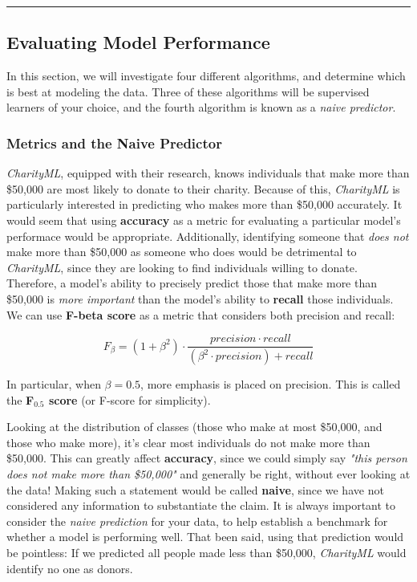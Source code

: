 \documentclass[11pt]{article}
\begin{document}
    \begin{center}\rule{0.5\linewidth}{\linethickness}\end{center}

\subsection{Evaluating Model
Performance}\label{evaluating-model-performance}

In this section, we will investigate four different algorithms, and
determine which is best at modeling the data. Three of these algorithms
will be supervised learners of your choice, and the fourth algorithm is
known as a \emph{naive predictor}.

    \subsubsection{Metrics and the Naive
Predictor}\label{metrics-and-the-naive-predictor}

\emph{CharityML}, equipped with their research, knows individuals that
make more than \$50,000 are most likely to donate to their charity.
Because of this, \emph{CharityML} is particularly interested in
predicting who makes more than \$50,000 accurately. It would seem that
using \textbf{accuracy} as a metric for evaluating a particular model's
performace would be appropriate. Additionally, identifying someone that
\emph{does not} make more than \$50,000 as someone who does would be
detrimental to \emph{CharityML}, since they are looking to find
individuals willing to donate. Therefore, a model's ability to precisely
predict those that make more than \$50,000 is \emph{more important} than
the model's ability to \textbf{recall} those individuals. We can use
\textbf{F-beta score} as a metric that considers both precision and
recall:

\[ F_{\beta} = (1 + \beta^2) \cdot \frac{precision \cdot recall}{\left( \beta^2 \cdot precision \right) + recall} \]

In particular, when \(\beta = 0.5\), more emphasis is placed on
precision. This is called the \textbf{F\(_{0.5}\) score} (or F-score for
simplicity).

Looking at the distribution of classes (those who make at most \$50,000,
and those who make more), it's clear most individuals do not make more
than \$50,000. This can greatly affect \textbf{accuracy}, since we could
simply say \emph{"this person does not make more than \$50,000"} and
generally be right, without ever looking at the data! Making such a
statement would be called \textbf{naive}, since we have not considered
any information to substantiate the claim. It is always important to
consider the \emph{naive prediction} for your data, to help establish a
benchmark for whether a model is performing well. That been said, using
that prediction would be pointless: If we predicted all people made less
than \$50,000, \emph{CharityML} would identify no one as donors.
\end{document}
